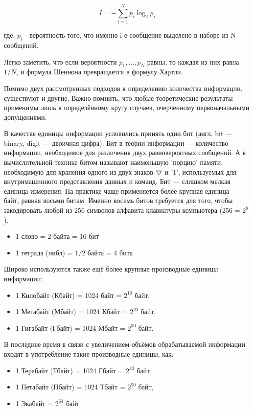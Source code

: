 \documentclass[a4paper]{article}
\begin{document}
\begin{equation}
  I = -\sum_{i=1}^{N}p_{i}\log_{2}p_{i}
\end{equation}

\begin{center}
  где, $p_{i}$ - вероятность того, что именно i-е сообщение выделено в наборе из N сообщений.
\end{center}

Легко заметить, что если вероятности $p_{1}, ... , p_{N}$ равны, то каждая из них равна $1/N$, и формула Шеннона превращается в формулу Хартли.

Помимо двух рассмотренных подходов к определению количества информации, существуют и другие. Важно помнить, что любые теоретические результаты применимы лишь к определённому кругу случаев, очерченному первоначальными допущениями.

В качестве единицы информации условились принять один бит (англ. bit — binary, digit — двоичная цифра). Бит в теории информации — количество информации, необходимое для различения двух равновероятных сообщений. А в вычислительной технике битом называют наименьшую 'порцию' памяти, необходимую для хранения одного из двух знаков '0' и '1', используемых для внутримашинного представления данных и команд.
Бит — слишком мелкая единица измерения. На практике чаще применяется более крупная единица — байт, равная восьми битам. Именно восемь битов требуется для того, чтобы закодировать любой из 256 символов алфавита клавиатуры компьютера (256 = $2^{8}$).

\begin{itemize}
  \item 1 слово = 2 байта = 16 бит
  \item 1  тетрада (нибл) = 1/2 байта = 4 бита
\end{itemize}

Широко используются также ещё более крупные производные единицы информации:
\begin{itemize}
  \item 1 Килобайт (Кбайт) = 1024 байт = $2^{10}$ байт,
  \item 1 Мегабайт (Мбайт) = 1024 Кбайт = $2^{20}$ байт,
  \item 1 Гигабайт (Гбайт) = 1024 Мбайт = $2^{30}$ байт.
\end{itemize}

В последнее время в связи с увеличением объёмов обрабатываемой информации входят в употребление такие производные единицы, как:
\begin{itemize}
  \item 1 Терабайт (Тбайт) = 1024 Гбайт = $2^{40}$ байт,
  \item 1 Петабайт (Пбайт) = 1024 Тбайт = $2^{50}$ байт,
  \item 1 Экабайт = $2^{64}$ байт.
\end{itemize}
\end{document}
